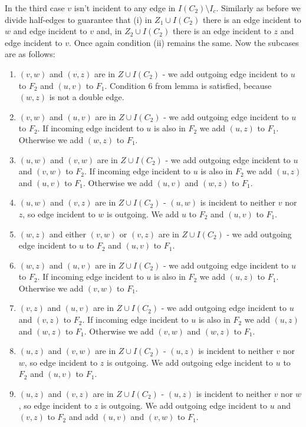 \documentclass[a4, 11pt]{article}
\newcommand{\<}{\langle}
\renewcommand{\>}{\rangle}
\begin{document}
In the third case $v$ isn't incident to any edge in $I(C_2) \setminus I_c$. Similarly as before we divide half-edges to guarantee that (i) in $Z_1 \cup I(C_2)$ there is an edge incident to $w$ and edge incident to $v$ and, in $Z_2 \cup I(C_2)$ there is an edge incident to $z$ and edge incident to $v$. Once again condition (ii) remains the same. Now the subcases are as follows:
\begin{enumerate}
	\item $(v,w)$ and $(v,z)$ are in $Z \cup I(C_2)$ - we add outgoing edge incident to $u$ to $F_2$ and $(u,v)$ to $F_1$. Condition 6 from lemma is satisfied, because $(w,z)$ is not a double edge.
	\item $(v,w)$ and $(u,v)$ are in $Z \cup I(C_2)$ - we add outgoing edge incident to $u$ to $F_2$. If incoming edge incident to $u$ is also in $F_2$ we add $(u,z)$ to $F_1$. Otherwise we add $(w,z)$ to $F_1$.
	\item $(u,w)$ and $(v,w)$ are in $Z \cup I(C_2)$ - we add outgoing edge incident to $u$ and $(v,w)$ to $F_2$. If incoming edge incident to $u$ is also in $F_2$ we add $(u,z)$ and $(u,v)$ to $F_1$. Otherwise we add $(u,v)$ and $(w,z)$ to $F_1$.
	\item $(u,w)$ and $(v,z)$ are in $Z \cup I(C_2)$ - $(u,w)$ is incident to neither $v$ nor $z$, so edge incident to $w$ is outgoing. We add $u$ to $F_2$ and $(u,v)$ to $F_1$.
	\item $(w,z)$ and either $(v,w)$ or $(v,z)$ are in $Z \cup I(C_2)$ - we add outgoing edge incident to $u$ to $F_2$ and $(u,v)$ to $F_1$.
	\item $(w,z)$ and $(u,v)$ are in $Z \cup I(C_2)$ - we add outgoing edge incident to $u$ to $F_2$. If incoming edge incident to $u$ is also in $F_2$ we add $(u,z)$ to $F_1$. Otherwise we add $(v,w)$ to $F_1$.
	\item $(v,z)$ and $(u,v)$ are in $Z \cup I(C_2)$ - we add outgoing edge incident to $u$ and $(v,z)$ to $F_2$. If incoming edge incident to $u$ is also in $F_2$ we add $(u,z)$ and $(w,z)$ to $F_1$. Otherwise we add $(v,w)$ and $(w,z)$ to $F_1$.
	\item $(u,z)$ and $(v,w)$ are in $Z \cup I(C_2)$ - $(u,z)$ is incident to neither $v$ nor $w$, so edge incident to $z$ is outgoing. We add outgoing edge incident to $u$ to $F_2$ and $(u,v)$ to $F_1$.
	\item $(u,z)$ and $(v,z)$ are in $Z \cup I(C_2)$ - $(u,z)$ is incident to neither $v$ nor $w$, so edge incident to $z$ is outgoing. We add outgoing edge incident to $u$ and $(v,z)$ to $F_2$ and add $(u,v)$ and $(v,w)$ to $F_1$.
\end{enumerate}
\end{document}
